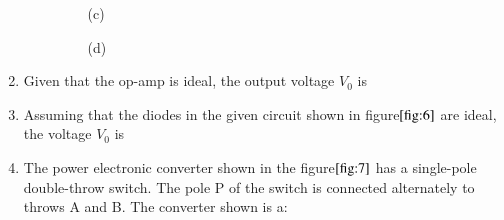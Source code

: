 \documentclass[journal]{IEEEtran}
\numberwithin{equation}{enumi}
\numberwithin{figure}{enumi}
\begin{document}
\begin{enumerate}
\begin{enumerate}
\begin{figure}[H]
        \begin{minipage}{0.45\linewidth}
            \centering
            
            \caption*{(c)}
        \end{minipage}%
        \hfill
        \begin{minipage}{0.45\linewidth}
            \centering
            
            \caption*{(d)}
        \end{minipage}

    \end{figure}
    
\end{enumerate}

\item Given that the op-amp is ideal, the output voltage $V_0$ is
	\begin{figure}[!ht]
    
			\centering
			
			\caption{}
			\label{fig:5}
		\end{figure}

\begin{enumerate}
\end{enumerate}

\item Assuming that the diodes in the given circuit shown in figure$\ref{fig:6}$ are ideal, the voltage $V_0$ is
\begin{figure}[!ht]
    
			\centering
			
			\caption{}
			\label{fig:6}
		\end{figure}

\begin{enumerate}
\end{enumerate}

    \item The power electronic converter shown in the figure$\ref{fig:7}$ has a single-pole double-throw switch. The pole P of the switch is connected alternately to throws A and B. The converter shown is a:
    \begin{figure}[!ht]
    

\end{figure}
\end{enumerate}
\end{document}

